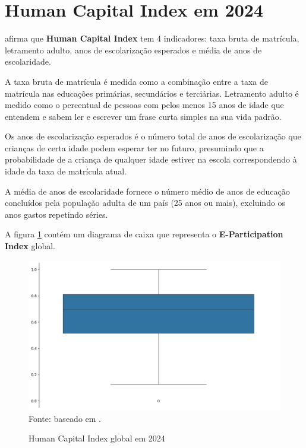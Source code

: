 \section{Human Capital Index em 2024}
\label{hci}

\cite{ONU_EGDI_methodology} afirma que \textbf{Human Capital Index} tem 4 indicadores: taxa bruta de matrícula, letramento adulto, anos de escolarização esperados e média de anos de escolaridade. 

A taxa bruta de matrícula é medida como a combinação entre a taxa de matrícula nas educações primárias, secundários e terciárias. Letramento adulto é medido como o percentual de pessoas com pelos menos 15 anos de idade que entendem e sabem ler e escrever um frase curta simples na sua vida padrão.

Os anos de escolarização esperados é o número total de anos de escolarização que crianças de certa idade podem esperar ter no futuro, presumindo que a probabilidade de a criança de qualquer idade estiver na escola correspondendo à idade da taxa de matrícula atual.

A média de anos de escolaridade fornece o número médio de anos de educação concluídos pela população adulta de um país (25 anos ou mais), excluindo os anos gastos repetindo séries. 

A figura \ref{fig:boxplot_hci_global} contém um diagrama de caixa que representa o \textbf{E-Participation Index} global.

\begin{figure}[H]
	\centering
	\caption{Human Capital Index global em 2024}
	\includegraphics[width=1\linewidth]{figuras/egdi/boxplot_hci_global.png}
	\label{fig:boxplot_hci_global}
	\footnotesize{Fonte: baseado em \cite{ONU_EGDI_mapa}.}
\end{figure}

